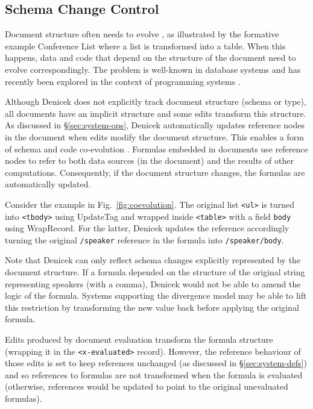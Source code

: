 \documentclass[sigconf]{acmart}
\newcommand{\diff}[1]{{#1}}
\newcommand{\note}[1]{}
\newcommand{\ident}[1]{{\sffamily #1}}
\begin{document}

\subsection{Schema Change Control}
\label{sec:impl-schema}

Document structure often needs to evolve \cite{burnett-2014-silos}, as illustrated by the formative
example Conference List where a list is transformed into a table. When this happens,
data and code that depend on the structure of the document need to evolve correspondingly.
The problem is well-known in database systems \cite{rahm-2006-schema} and has recently been
explored in the context of programming systems \cite{edwards-2025-schema}.

Although Denicek does not explicitly track document structure (schema or type), all documents
have an implicit structure and some edits transform this structure. As
discussed in \S\ref{sec:system-ops}, Denicek automatically updates reference nodes in the
document when edits modify the document structure. This enables a form of schema and code
co-evolution \cite{edwards-2025-schema}. Formulas embedded in documents use reference
nodes to refer to both data sources (in the document) and the results of other computations.
Consequently, if the document structure changes, the formulas are automatically updated.

Consider the example in Fig.~\ref{fig:coevolution}. The original list {\small\texttt{<ul>}} is
turned into {\small\texttt{<tbody>}} using \ident{UpdateTag} and wrapped inside {\small\texttt{<table>}}
with a field {\small\texttt{body}} using \ident{WrapRecord}. For the latter, Denicek updates the
reference accordingly turning the original {\small\texttt{/speaker}} reference in the formula
into {\small\texttt{/speaker/body}}.

\diff{Note that Denicek can only reflect schema changes explicitly represented by the document
structure. If a formula depended on the structure of the original string representing speakers
(with a comma), Denicek would not be able to amend the logic of the formula. Systems supporting
the divergence model \cite{edwards-2025-schema} may be able to lift this restriction by
transforming the new value back before applying the original formula.}
\note{Added response to R3's question about schema change}

Edits produced by document evaluation transform the formula structure (wrapping it in the
{\small\texttt{<x-evaluated>}} record). However, the reference behaviour of those edits is set
to keep references unchanged (as discussed in \S\ref{sec:system-defs}) and so references to
formulas are not transformed when the formula is evaluated (otherwise, references
would be updated to point to the original unevaluated formulas).
\end{document}
